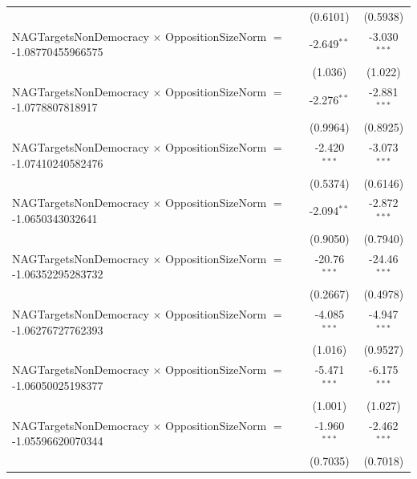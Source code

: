 \begin{tabular}{lcc}
                                                                                & (0.6101)             & (0.5938)\\   
   NAGTargetsNonDemocracy $\times$ OppositionSizeNorm $=$ -1.08770455966575     & -2.649$^{**}$        & -3.030$^{***}$\\   
                                                                                & (1.036)              & (1.022)\\   
   NAGTargetsNonDemocracy $\times$ OppositionSizeNorm $=$ -1.0778807818917      & -2.276$^{**}$        & -2.881$^{***}$\\   
                                                                                & (0.9964)             & (0.8925)\\   
   NAGTargetsNonDemocracy $\times$ OppositionSizeNorm $=$ -1.07410240582476     & -2.420$^{***}$       & -3.073$^{***}$\\   
                                                                                & (0.5374)             & (0.6146)\\   
   NAGTargetsNonDemocracy $\times$ OppositionSizeNorm $=$ -1.0650343032641      & -2.094$^{**}$        & -2.872$^{***}$\\   
                                                                                & (0.9050)             & (0.7940)\\   
   NAGTargetsNonDemocracy $\times$ OppositionSizeNorm $=$ -1.06352295283732     & -20.76$^{***}$       & -24.46$^{***}$\\   
                                                                                & (0.2667)             & (0.4978)\\   
   NAGTargetsNonDemocracy $\times$ OppositionSizeNorm $=$ -1.06276727762393     & -4.085$^{***}$       & -4.947$^{***}$\\   
                                                                                & (1.016)              & (0.9527)\\   
   NAGTargetsNonDemocracy $\times$ OppositionSizeNorm $=$ -1.06050025198377     & -5.471$^{***}$       & -6.175$^{***}$\\   
                                                                                & (1.001)              & (1.027)\\   
   NAGTargetsNonDemocracy $\times$ OppositionSizeNorm $=$ -1.05596620070344     & -1.960$^{***}$       & -2.462$^{***}$\\   
                                                                                & (0.7035)             & (0.7018)\\   

\end{tabular}
